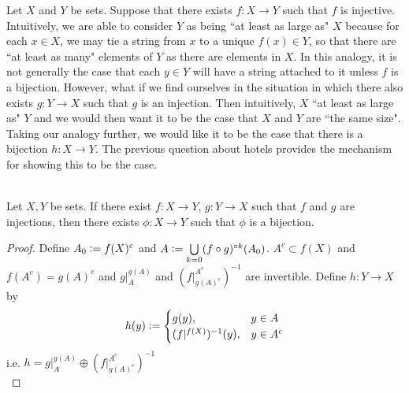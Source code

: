 \documentclass{book}
\begin{document}
	
	Let $X$ and $Y$ be sets. Suppose that there exists $f:X \rightarrow Y$ such that $f$ is injective.  Intuitively, we are able to consider $Y$ as being ``at least as large as" $X$ because for each $x \in X$, we may tie a string from $x$ to a unique $f(x) \in Y$, so that there are ``at least as many" elements of $Y$ as there are elements in $X$. In this analogy, it is not generally the case that each $y \in Y$ will have a string attached to it unless $f$ is a bijection. However, what if we find ourselves in the situation in which there also exists $g:Y \rightarrow X$ such that $g$ is an injection. Then intuitively, $X$ ``at least as large as" $Y$ and we would then want it to be the case that $X$ and $Y$ are ``the same size". Taking our analogy further, we would like it to be the case that there is a bijection $h:X \rightarrow Y$. The previous question about hotels provides the mechanism for showing this to be the case.
	
	\begin{ex}  \\
		Let $X,Y$ be sets. If there exist $f:X \rightarrow Y$, $g:Y \rightarrow X$ such that $f$ and $g$ are injections, then there exists $\phi:X \rightarrow Y$ such that $\phi$ is a bijection.
	\end{ex}
	
	\begin{proof}
		Define $A_0 \vcentcolon= f(X)^c$ and $A \vcentcolon= \bigcup\limits_{k=0} (f \circ g)^{\circ k} (A_0)$.  $A^c \subset f(X)$ and $f(A^c) = g(A)^c$ and  $g|^{g(A)}_A$ and $(f|^{A^c}_{g(A)^c})^{-1}$ are invertible. Define $h:Y \rightarrow X$ by 
		\[
		h(y) \vcentcolon= 
		\begin{cases}
		g(y), & y \in A \\
		(f|^{f(X)})^{-1}(y), & y \in A^c	
		\end{cases}
		\]
		i.e. $h = g|^{g(A)}_A \oplus (f|^{A^c}_{g(A)^c})^{-1}$\\
	\end{proof}
	
	
	
	
	
	
	
	
	
\end{document}
